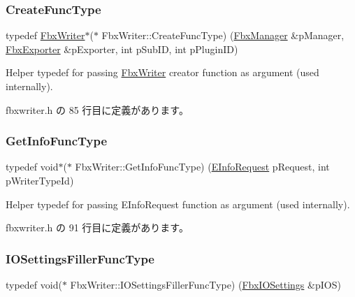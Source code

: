 \subsubsection{\texorpdfstring{Create\+Func\+Type}{CreateFuncType}}
{\footnotesize\ttfamily typedef \hyperlink{class_fbx_writer}{Fbx\+Writer}$\ast$($\ast$ Fbx\+Writer\+::\+Create\+Func\+Type) (\hyperlink{class_fbx_manager}{Fbx\+Manager} \&p\+Manager, \hyperlink{class_fbx_exporter}{Fbx\+Exporter} \&p\+Exporter, int p\+Sub\+ID, int p\+Plugin\+ID)}



Helper typedef for passing \hyperlink{class_fbx_writer}{Fbx\+Writer} creator function as argument (used internally). 



 fbxwriter.\+h の 85 行目に定義があります。

\mbox{\label{class_fbx_writer_a6c13529045946d474e1e69fa0a6b9305}} 
\subsubsection{\texorpdfstring{Get\+Info\+Func\+Type}{GetInfoFuncType}}
{\footnotesize\ttfamily typedef void$\ast$($\ast$ Fbx\+Writer\+::\+Get\+Info\+Func\+Type) (\hyperlink{class_fbx_writer_a250cda8a59afd8e6be01c89cdd914e2a}{E\+Info\+Request} p\+Request, int p\+Writer\+Type\+Id)}



Helper typedef for passing E\+Info\+Request function as argument (used internally). 



 fbxwriter.\+h の 91 行目に定義があります。

\mbox{\label{class_fbx_writer_a43eb86f1aae1a6a424c54bcf294553c5}} 
\subsubsection{\texorpdfstring{I\+O\+Settings\+Filler\+Func\+Type}{IOSettingsFillerFuncType}}
{\footnotesize\ttfamily typedef void($\ast$ Fbx\+Writer\+::\+I\+O\+Settings\+Filler\+Func\+Type) (\hyperlink{class_fbx_i_o_settings}{Fbx\+I\+O\+Settings} \&p\+I\+OS)}



